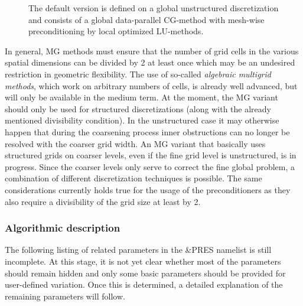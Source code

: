 \begin{figure}[ht]
\centering
\caption{The default \uscarc{} version is defined on a global unstructured discretization and consists of a global data-parallel CG-method with mesh-wise preconditioning by local optimized LU-methods.} 
\label{FIG_default_uscarc}
\end{figure}
 
In general, MG methods must ensure that the number of grid cells in the various spatial dimensions can be divided by 2 at least once which may be an undesired restriction in geometric flexibility.
 The use of so-called {\it algebraic multigrid methods}, which work on arbitrary numbers of cells, is already well advanced, but will only be available in the medium term.
At the moment, the MG variant should only be used for structured discretizations (along with the already mentioned divisibility condition). In the unstructured case it may otherwise happen that during the coarsening process inner obstructions can no longer be resolved with the coarser grid width. 
An MG variant that basically uses structured grids on coarser levels, even if the fine grid level is unstructured, is in progress. Since the coarser levels only serve to correct the fine global problem, a combination of different discretization techniques is possible.
The same considerations currently holds true for the usage of the \tls{} preconditioners as they also require a divisibility of the grid size at least by 2.

\subsubsection{Algorithmic description}

The following listing of \scarc{} related parameters in the {\ct \&PRES} namelist is still incomplete.
At this stage, it is not yet clear whether most of the \scarc{} parameters should remain hidden and only some basic parameters should be provided for user-defined variation. Once this is determined, a detailed explanation of the remaining parameters will follow.

